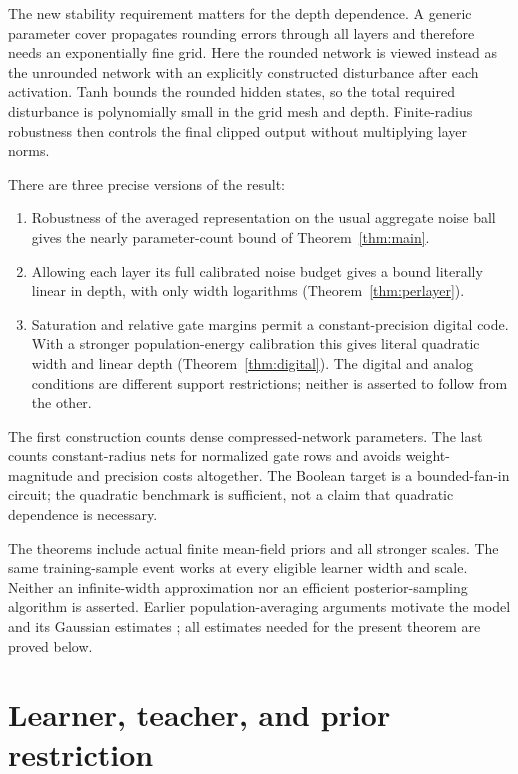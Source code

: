 \documentclass[11pt]{article}
\begin{document}
The new stability requirement matters for the depth dependence. A generic
parameter cover propagates rounding errors through all layers and therefore
needs an exponentially fine grid. Here the rounded network is viewed instead
as the unrounded network with an explicitly constructed disturbance after
each activation. Tanh bounds the rounded hidden states, so the total
required disturbance is polynomially small in the grid mesh and depth.
Finite-radius robustness then controls the final clipped output without
multiplying layer norms.

There are three precise versions of the result:
\begin{enumerate}[leftmargin=*]
\item Robustness of the averaged representation on the usual aggregate
noise ball gives the nearly parameter-count bound of
Theorem~\ref{thm:main}.
\item Allowing each layer its full calibrated noise budget gives a bound
literally linear in depth, with only width logarithms
(Theorem~\ref{thm:perlayer}).
\item Saturation and relative gate margins permit a constant-precision
digital code. With a stronger population-energy calibration this gives
literal quadratic width and linear depth
(Theorem~\ref{thm:digital}). The digital and analog conditions are different
support restrictions; neither is asserted to follow from the other.
\end{enumerate}
The first construction counts dense compressed-network parameters. The
last counts constant-radius nets for normalized gate rows and avoids
weight-magnitude and precision costs altogether. The Boolean target is
a bounded-fan-in circuit; the quadratic benchmark is sufficient, not a
claim that quadratic dependence is necessary.

The theorems include actual finite mean-field priors and all stronger
scales. The same training-sample event works at every eligible learner
width and scale. Neither an infinite-width approximation nor an efficient
posterior-sampling algorithm is asserted. Earlier population-averaging
arguments motivate the model and its Gaussian estimates \cite{averaging};
all estimates needed for the present theorem are proved below.

\section{Learner, teacher, and prior restriction}
\end{document}
